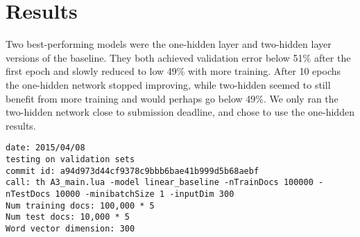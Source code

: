 \documentclass{article} %
\begin{document}
\section{Results}
\label{results}

Two best-performing models were the one-hidden layer and two-hidden layer versions of the baseline. They both achieved validation error below 51\% after the first epoch and slowly reduced to low 49\% with more training. After 10 epochs the one-hidden network stopped improving, while two-hidden seemed to still benefit from more training and would perhaps go below 49\%. We only ran the two-hidden network close to submission deadline, and chose to use the one-hidden results.

\begin{lstlisting}
date: 2015/04/08
testing on validation sets
commit id: a94d973d44cf9378c9bbb6bae41b999d5b68aebf
call: th A3_main.lua -model linear_baseline -nTrainDocs 100000 -nTestDocs 10000 -minibatchSize 1 -inputDim 300
Num training docs: 100,000 * 5
Num test docs: 10,000 * 5
Word vector dimension: 300
\end{lstlisting}

	

	
\end{document}
